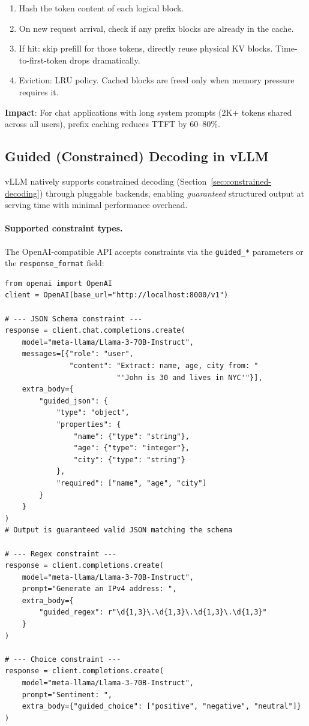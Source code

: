 \begin{enumerate}
  \item Hash the token content of each logical block.
  \item On new request arrival, check if any prefix blocks are already in the cache.
  \item If hit: skip prefill for those tokens, directly reuse physical KV blocks. Time-to-first-token drops dramatically.
  \item Eviction: LRU policy. Cached blocks are freed only when memory pressure requires it.
\end{enumerate}

\textbf{Impact}: For chat applications with long system prompts (2K+ tokens shared across all users), prefix caching reduces TTFT by 60--80\%.

\subsection{Guided (Constrained) Decoding in vLLM}
\label{sec:vllm-guided-decoding}

vLLM natively supports constrained decoding (Section~\ref{sec:constrained-decoding}) through pluggable backends, enabling \emph{guaranteed} structured output at serving time with minimal performance overhead.

\paragraph{Supported constraint types.}
\label{supported-constraint-types.}

The OpenAI-compatible API accepts constraints via the \texttt{guided\_*} parameters or the \texttt{response\_format} field:

\begin{lstlisting}[style=pythonstyle]
from openai import OpenAI
client = OpenAI(base_url="http://localhost:8000/v1")

# --- JSON Schema constraint ---
response = client.chat.completions.create(
    model="meta-llama/Llama-3-70B-Instruct",
    messages=[{"role": "user",
               "content": "Extract: name, age, city from: "
                          "'John is 30 and lives in NYC'"}],
    extra_body={
        "guided_json": {
            "type": "object",
            "properties": {
                "name": {"type": "string"},
                "age": {"type": "integer"},
                "city": {"type": "string"}
            },
            "required": ["name", "age", "city"]
        }
    }
)
# Output is guaranteed valid JSON matching the schema

# --- Regex constraint ---
response = client.completions.create(
    model="meta-llama/Llama-3-70B-Instruct",
    prompt="Generate an IPv4 address: ",
    extra_body={
        "guided_regex": r"\d{1,3}\.\d{1,3}\.\d{1,3}\.\d{1,3}"
    }
)

# --- Choice constraint ---
response = client.completions.create(
    model="meta-llama/Llama-3-70B-Instruct",
    prompt="Sentiment: ",
    extra_body={"guided_choice": ["positive", "negative", "neutral"]}
)
\end{lstlisting}

